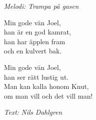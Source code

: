 {\footnotesize\textit{Melodi: Trampa på gasen}}\par
\vspace{10pt}
Min gode vän Joel,\\
han är en god kamrat,\\
han har äpplen fram\\
och en kulvert bak.\par
\vspace{10pt}
Min gode vän Joel,\\
han ser rätt lustig ut.\\
Man kan kalla honom Knut,\\
om man vill och det vill man!
\par
\vspace{10pt}
{\footnotesize\textit{Text: Nils Dahlgren}}